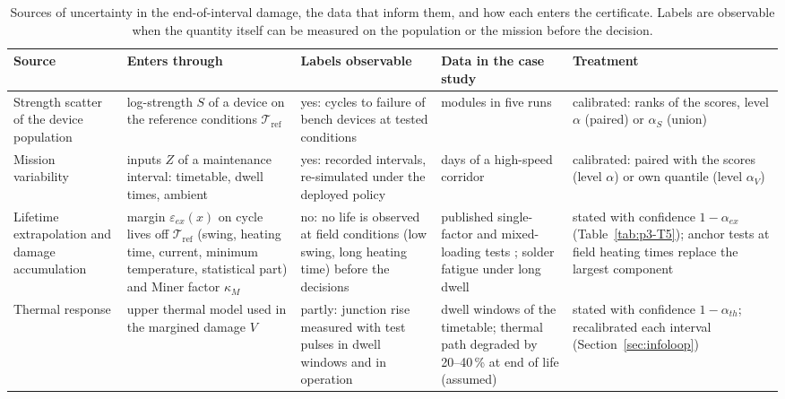 \begin{table}[tbp]
\centering
\caption{Sources of uncertainty in the end-of-interval damage, the data that inform them, and how each enters the
certificate. Labels are observable when the quantity itself can be measured on the population or the mission before the
decision.}
\label{tab:p3-T1}
\footnotesize
\begin{tabularx}{\textwidth}{@{}>{\raggedright\arraybackslash}p{2.3cm}>{\raggedright\arraybackslash}X
>{\raggedright\arraybackslash}p{3.3cm}>{\raggedright\arraybackslash}X>{\raggedright\arraybackslash}p{3.4cm}@{}}
\toprule
Source & Enters through & Labels observable & Data in the case study & Treatment \\
\midrule
Strength scatter of the device population & log-strength $S$ of a device on the reference conditions
$\mathcal T_{\mathrm{ref}}$ & yes: cycles to failure of bench devices at tested conditions & 34 modules in five runs
\cite{hernes2021} & calibrated: ranks of the scores, level $\alpha$ (paired)
or $\alpha_S$ (union) \\
\addlinespace
Mission variability & inputs $Z$ of a maintenance interval: timetable, dwell times, ambient & yes: recorded intervals,
re-simulated under the deployed policy & 112 days of a high-speed corridor \cite{zhang2022hsr} & calibrated: paired with the scores (level $\alpha$) or own quantile (level $\alpha_V$) \\
\addlinespace
Lifetime extrapolation and damage accumulation & margin $\varepsilon_{ex}(x)$ on cycle lives off
$\mathcal T_{\mathrm{ref}}$ (swing, heating time, current, minimum temperature, statistical part) and Miner factor
$\kappa_M$ & no: no life is observed at field conditions (low swing, long heating time) before the decisions & published
single-factor and mixed-loading tests \cite{junghaenel2017mr,choi2017,choi2018mr,hernes2021pcim,choi2017apec}; solder
fatigue under long dwell \cite{engelmaier1983} & stated with confidence $1-\alpha_{ex}$ (Table~\ref{tab:p3-T5});
anchor tests at field heating times replace the largest component \\
\addlinespace
Thermal response & upper thermal model used in the margined damage $V$ & partly: junction rise measured with test
pulses in dwell windows and in operation & dwell windows of the timetable; thermal path degraded by 20--40\,\% at end
of life (assumed) & stated with confidence $1-\alpha_{th}$; recalibrated each interval (Section~\ref{sec:infoloop}) \\
\bottomrule
\end{tabularx}
\end{table}
